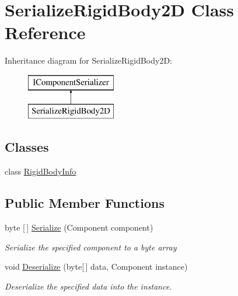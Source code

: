 \hypertarget{class_serialize_rigid_body2_d}{}\section{Serialize\+Rigid\+Body2D Class Reference}
\label{class_serialize_rigid_body2_d}
Inheritance diagram for Serialize\+Rigid\+Body2D\+:\begin{figure}[H]
\begin{center}
\leavevmode
\includegraphics[height=2.000000cm]{class_serialize_rigid_body2_d}
\end{center}
\end{figure}
\subsection*{Classes}
\begin{DoxyCompactItemize}
\item 
class \hyperlink{class_serialize_rigid_body2_d_1_1_rigid_body_info}{Rigid\+Body\+Info}
\end{DoxyCompactItemize}
\subsection*{Public Member Functions}
\begin{DoxyCompactItemize}
\item 
byte \mbox{[}$\,$\mbox{]} \hyperlink{class_serialize_rigid_body2_d_a40d4ecd6dc6a136cb123fbb76d6ead00}{Serialize} (Component component)
\begin{DoxyCompactList}\small\item\em Serialize the specified component to a byte array \end{DoxyCompactList}\item 
void \hyperlink{class_serialize_rigid_body2_d_ae143c153be5caaaa898e0d7e2951fbd2}{Deserialize} (byte\mbox{[}$\,$\mbox{]} data, Component instance)
\begin{DoxyCompactList}\small\item\em Deserialize the specified data into the instance. \end{DoxyCompactList}\end{DoxyCompactItemize}


